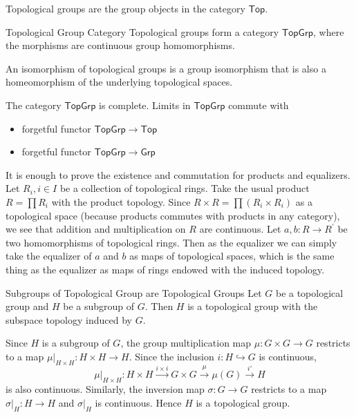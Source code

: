 \documentclass{report}
\begin{document}
\noindent Topological groups are the group objects in the category $\mathsf{Top}$.
\begin{definition}{Topological Group Category}{}
	Topological groups form a category $\mathsf{TopGrp}$, where the morphisms are continuous group homomorphisms.
\end{definition}

\noindent An isomorphism of topological groups is a group isomorphism that is also a homeomorphism of the underlying topological spaces.
\begin{proposition}{}{}
	The category $\mathsf{TopGrp}$ is complete. Limits in $\mathsf{TopGrp}$ commute with
	\begin{itemize}
		\item forgetful functor $\mathsf{TopGrp}\to\mathsf{Top}$
		\item forgetful functor $\mathsf{TopGrp}\to\mathsf{Grp}$
	\end{itemize}
\end{proposition}

\begin{prf}
	It is enough to prove the existence and commutation for products and equalizers. Let $R_i, i \in I$ be a collection of topological rings. Take the usual product $R=\prod R_i$ with the product topology. Since $R \times R=\prod\left(R_i \times R_i\right)$ as a topological space (because products commutes with products in any category), we see that addition and multiplication on $R$ are continuous. Let $a, b: R \rightarrow R^{\prime}$ be two homomorphisms of topological rings. Then as the equalizer we can simply take the equalizer of $a$ and $b$ as maps of topological spaces, which is the same thing as the equalizer as maps of rings endowed with the induced topology.
\end{prf}


\begin{proposition}{Subgroups of Topological Group are Topological Groups}{}
	Let $G$ be a topological group and $H$ be a subgroup of $G$. Then $H$ is a topological group with the subspace topology induced by $G$.
\end{proposition}

\begin{prf}
	Since $H$ is a subgroup of $G$, the group multiplication map $\mu:G\times G\to G$ restricts to a map $\mu|_{H\times H}:H\times H\to H$. Since the inclusion $i:H\hookrightarrow G$ is continuous,
	\[
		\mu|_{H\times H}:H \times H \xrightarrow{i\times i} G\times G\xrightarrow{\mu}\mu(G)  \xrightarrow{i'} H
	\]
	is also continuous. Similarly, the inversion map $\sigma:G\to G$ restricts to a map $\sigma|_H:H\to H$ and $\sigma|_H$ is continuous. Hence $H$ is a topological group.

\end{prf}
\end{document}
